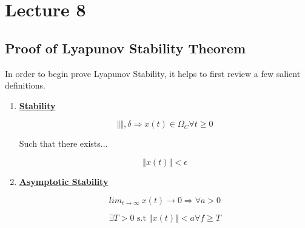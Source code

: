 \section*{Lecture 8}

%


\subsection*{Proof of Lyapunov Stability Theorem}

In order to begin prove Lyapunov Stability, it helps to first review a few salient definitions.

\begin{enumerate}
  \item \underline{\textbf{Stability}}

  $$
\left\Vert  \right\Vert , \delta \Rightarrow x(t) \in \Omega_C \forall t \geq 0
  $$

  \noindent Such that there exists...

  $$
  \left\Vert x(t) \right\Vert < \epsilon
  $$


  \item \underline{\textbf{Asymptotic Stability}}

  $$
lim_{t \to \infty} \: x(t) \rightarrow 0 \Rightarrow \forall a > 0
  $$

  $$
\exists T > 0 \text{  s.t } \left\Vert x(t) \right\Vert < a \forall f \geq T
  $$
\end{enumerate}
